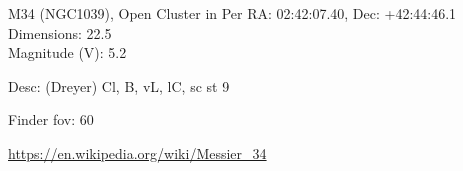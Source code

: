 \begin{block}{M34 (NGC1039), Open Cluster in Per}
    RA: 02:42:07.40, Dec: +42:44:46.1 \\ 
    Dimensions: 22.5 \\ 
    Magnitude (V): 5.2


    Desc: (Dreyer) Cl, B, vL, lC, sc st 9 

    Finder fov: 60 

    \url{https://en.wikipedia.org/wiki/Messier_34} 
\end{block}